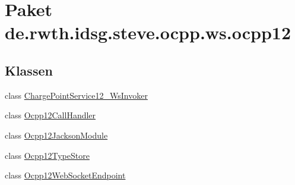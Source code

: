 \hypertarget{namespacede_1_1rwth_1_1idsg_1_1steve_1_1ocpp_1_1ws_1_1ocpp12}{\section{Paket de.\+rwth.\+idsg.\+steve.\+ocpp.\+ws.\+ocpp12}
\label{namespacede_1_1rwth_1_1idsg_1_1steve_1_1ocpp_1_1ws_1_1ocpp12}
}
\subsection*{Klassen}
\begin{DoxyCompactItemize}
\item 
class \hyperlink{classde_1_1rwth_1_1idsg_1_1steve_1_1ocpp_1_1ws_1_1ocpp12_1_1_charge_point_service12___ws_invoker}{Charge\+Point\+Service12\+\_\+\+Ws\+Invoker}
\item 
class \hyperlink{classde_1_1rwth_1_1idsg_1_1steve_1_1ocpp_1_1ws_1_1ocpp12_1_1_ocpp12_call_handler}{Ocpp12\+Call\+Handler}
\item 
class \hyperlink{classde_1_1rwth_1_1idsg_1_1steve_1_1ocpp_1_1ws_1_1ocpp12_1_1_ocpp12_jackson_module}{Ocpp12\+Jackson\+Module}
\item 
class \hyperlink{classde_1_1rwth_1_1idsg_1_1steve_1_1ocpp_1_1ws_1_1ocpp12_1_1_ocpp12_type_store}{Ocpp12\+Type\+Store}
\item 
class \hyperlink{classde_1_1rwth_1_1idsg_1_1steve_1_1ocpp_1_1ws_1_1ocpp12_1_1_ocpp12_web_socket_endpoint}{Ocpp12\+Web\+Socket\+Endpoint}
\end{DoxyCompactItemize}
